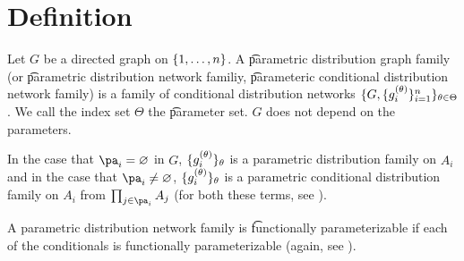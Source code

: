 

\section*{Definition}

Let $G$ be a directed graph on $\{1,\dots , n\}$.
A \t{parametric distribution graph family} (or \t{parametric distribution network familiy}, \t{parameteric conditional distribution network family}) is a family of conditional distribution networks $\{G, \{g_i^{(\theta )}\}_{i=1}^{n}\}_{\theta  \in \Theta }$.
We call the index set $\Theta $ the \t{parameter set}.
$G$ does not depend on the parameters.

In the case that $\pa_i = \varnothing$ in $G$, $\{g_i^{(\theta )}\}_\theta $ is a parametric distribution family on $A_i$ and in the case that $\pa_i \neq \varnothing$, $\{g_i^{(\theta )}\}_{\theta }$ is a parametric conditional distribution family on $A_i$ from $\prod_{j \in \pa_{i}} A_j$ (for both these terms, see ).

A parametric distribution network family is \t{functionally parameterizable} if each of the conditionals is functionally parameterizable (again, see ).

\blankpage